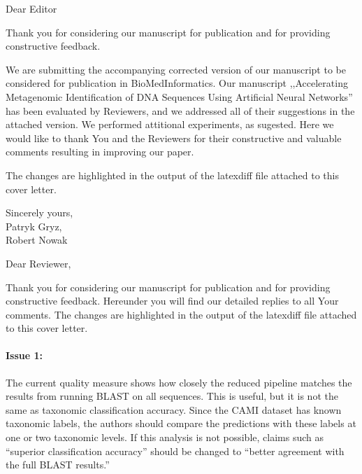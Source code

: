 \documentclass{article}
\begin{document}
Dear Editor

\vspace{0.25in}

Thank you for considering our manuscript for publication and for providing constructive feedback.

We are submitting the accompanying corrected version of our manuscript to be considered for publication in BioMedInformatics.
Our manuscript ,,Accelerating Metagenomic Identification of DNA Sequences Using Artificial Neural Networks'' has been evaluated by Reviewers, and we addressed all of their suggestions in the attached version. We performed attitional experiments, as sugested. Here we would like to thank You and the Reviewers for their constructive and valuable comments resulting in improving our paper.

The changes are highlighted in the output of the latexdiff file attached to this cover letter.


\vspace{0.25in}

Sincerely yours,\\
Patryk Gryz,\\
Robert Nowak\\

\pagebreak

Dear Reviewer,

\vspace{0.25in}

Thank you for considering our manuscript for publication and for providing constructive feedback.
Hereunder you will find our detailed replies to all Your comments.
The changes are highlighted in the output of the latexdiff file attached to this cover letter.

\paragraph{Issue 1:}
\begin{displayquote}
The current quality measure shows how closely the reduced pipeline matches the results from running BLAST on all sequences. This is useful, but it is not the same as taxonomic classification accuracy. Since the CAMI dataset has known taxonomic labels, the authors should compare the predictions with these labels at one or two taxonomic levels. If this analysis is not possible, claims such as “superior classification accuracy” should be changed to “better agreement with the full BLAST results.”
\end{displayquote}
\end{document}
